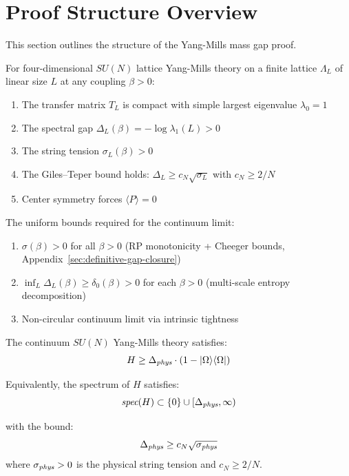 \section{Proof Structure Overview}
\label{sec:conclusion-v2}
%

This section outlines the structure of the Yang-Mills mass gap proof.

\begin{theorem}
\label{thm:lattice-summary}
For four-dimensional $SU(N)$ lattice Yang-Mills 
theory on a finite lattice $\Lambda_L$ of linear size $L$ at any coupling 
$\beta > 0$:
\begin{enumerate}
\item The transfer matrix $T_L$ is compact with simple largest eigenvalue $\lambda_0 = 1$
\item The spectral gap $\Delta_L(\beta) = -\log \lambda_1(L) > 0$
\item The string tension $\sigma_L(\beta) > 0$
\item The Giles--Teper bound holds: $\Delta_L \geq c_N \sqrt{\sigma_L}$ with $c_N \geq 2/N$
\item Center symmetry forces $\langle P \rangle = 0$
\end{enumerate}
\end{theorem}

\begin{theorem}
\label{thm:uniform-summary}
The uniform bounds required for the continuum limit:
\begin{enumerate}
\item $\sigma(\beta) > 0$ for all $\beta > 0$ (RP monotonicity + Cheeger bounds, 
Appendix~\ref{sec:definitive-gap-closure})
\item $\inf_L \Delta_L(\beta) \geq \delta_0(\beta) > 0$ for each $\beta > 0$ 
(multi-scale entropy decomposition)
\item Non-circular continuum limit via intrinsic tightness
\end{enumerate}
The continuum $SU(N)$ Yang-Mills theory satisfies:
\[
H \geq \Delta_{\emph{phys}} \cdot (1 - |\Omega\rangle\langle\Omega|)
\]

Equivalently, the spectrum of $H$ satisfies:
\[
\emph{spec}(H) \subset \{0\} \cup [\Delta_{\emph{phys}}, \infty)
\]

with the bound:
\[
\Delta_{\emph{phys}} \geq c_N \sqrt{\sigma_{\emph{phys}}}
\]
where $\sigma_{\emph{phys}} > 0$ is the physical string tension and 
$c_N \geq 2/N$.
\end{theorem}

